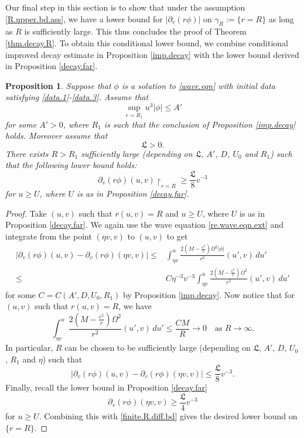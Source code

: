 \documentclass[12 pt, reqno]{amsart}
\newtheorem{proposition}[theorem]{Proposition}
\theoremstyle{definition}
\theoremstyle{remark}
\numberwithin{equation}{section}
\newcommand{\rd}{\partial}
\newcommand{\0}{\emptyset}
\newcommand{\Omg}{\Omega}
\newcommand{\f}{\frac}
\begin{document}
Our final step in this section is to show that under the assumption \eqref{R.upper.bd.ass}, we have a lower bound for $|\rd_v(r\phi)|$ on $\gamma_R:=\{r=R\}$ as long as $R$ is sufficiently large. This thus concludes the proof of Theorem \ref{thm.decay.R}. To obtain this conditional lower bound, we combine conditional improved decay estimate in Proposition \ref{imp.decay} with the lower bound derived in Proposition \ref{decay.far}.
\begin{proposition}\label{lower.bd.R}
Suppose that $\phi$ is a solution to \eqref{wave.eqn} with initial data satisfying \eqref{data.1}-\eqref{data.3}. 
Assume that
$$\sup_{r= R_1} u^3|\phi|\leq A'$$
for some $A'>0$, where $R_1$ is such that the conclusion of Proposition \ref{imp.decay} holds. 
Moreover assume that 
$$\mathfrak L> 0.$$
There exists $R>R_1$ sufficiently large (depending on $\mathfrak L$, $A'$, $D$, $U_0$ and $R_1$) such that the following lower bound holds:
$$\rd_v(r\phi)(u,v)\restriction_{r=R}\geq \f{\mathfrak L}{8}v^{-3}$$
for $u\geq U$, where $U$ is as in Proposition \ref{decay.far}.
\end{proposition}
\begin{proof}
Take $(u,v)$ such that $r(u,v)= R$ and $u\geq U$, where $U$ is as in Proposition \ref{decay.far}. We again use the wave equation \eqref{re.wave.eqn.ext} and integrate from the point $(\eta v, v)$ to $(u,v)$ to get
\begin{equation*}
\begin{split}
|\rd_v(r\phi)(u,v)-\rd_v(r\phi)(\eta v,v)|
\leq &\int_{\eta v}^u \f{2(M-\f{e^2}{r})\Omg^2|\phi|}{r^2}(u',v)\,du'\\
 \leq & C \eta^{-3} v^{-3} \int_{\eta v}^u \f{2(M-\f{e^2}{r})\Omg^2}{r^2}(u',v)\,du'
\end{split}
\end{equation*}
for some $C=C(A',D,U_0,R_1)$ by Proposition \ref{imp.decay}. Now notice that for $(u,v)$ such that $r(u,v)=R$, we have
$$\int_{\eta v}^u \f{2(M-\f{e^2}{r})\Omg^2}{r^2}(u',v)\,du'\leq \f{CM}{R}\to 0 \quad\mbox{as }R\to \infty.$$
In particular, $R$ can be chosen to be sufficiently large (depending on $\mathfrak L$, $A'$, $D$, $U_0$, $R_1$ and $\eta$) such that
\begin{equation}\label{finite.R.diff.bd}
|\rd_v(r\phi)(u,v)-\rd_v(r\phi)(\eta v,v)|\leq \f{\mathfrak L}{8} v^{-3}.
\end{equation}
Finally, recall the lower bound in Proposition \ref{decay.far}
$$\rd_v(r\phi)(\eta v,v)\geq \f{\mathfrak L}{4} v^{-3}$$ 
for $u\geq U$. Combining this with \eqref{finite.R.diff.bd} gives the desired lower bound on $\{r=R\}$.
\end{proof}
\end{document}
